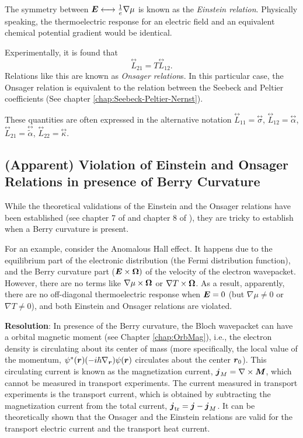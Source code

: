 \documentclass{report}
\renewcommand\vec[1]{\ensuremath\boldsymbol{#1}} %
\begin{document}
The symmetry between $\vec{E} \longleftrightarrow \frac{1}{e}\nabla \mu$ is known as the \textit{Einstein relation}. Physically speaking, the thermoelectric response for an electric field and an equivalent chemical potential gradient would be identical.
 
Experimentally, it is found that
\begin{equation}\label{Eq:Onsager-relation}
	\stackrel{\leftrightarrow}{L}_{21} = T \stackrel{\leftrightarrow}{L}_{12}.
\end{equation}
Relations like this are known as \textit{Onsager relation}s. In this particular case, the Onsager relation is equivalent to the relation between the Seebeck and Peltier coefficients (See chapter \ref{chap:Seebeck-Peltier-Nernst}).

These quantities are often expressed \cite{Ussishkin_2002} in the alternative notation $\stackrel{\leftrightarrow}{L}_{1 1} = \stackrel{\leftrightarrow}{\sigma}$, $\stackrel{\leftrightarrow}{L}_{1 2} = \stackrel{\leftrightarrow}{\alpha}$, $\stackrel{\leftrightarrow}{L}_{2 1} = \stackrel{\leftrightarrow}{\tilde{\alpha}}$, $\stackrel{\leftrightarrow}{L}_{2 2} = \stackrel{\leftrightarrow}{\kappa}$.

\subsection{(Apparent) Violation of Einstein and Onsager Relations in presence of Berry Curvature}\label{sec:Einstein-Onsager-violation}
While the theoretical validations of the Einstein and the Onsager relations have been established (see chapter 7 of \cite{book:ZimanSolidState} and chapter 8 of \cite{book:AshcroftMermin76}), they are tricky to establish when a Berry curvature is present.

For an example, consider the Anomalous Hall effect. It happens due to the equilibrium part of the electronic distribution (the Fermi distribution function), and the Berry curvature part ($\vec{E} \times \vec{\Omega})$ of the velocity of the electron wavepacket. However, there are no terms like $\nabla \mu \times \vec{\Omega}$ or $\nabla T \times \vec{\Omega}$. As a result, apparently, there are no off-diagonal thermoelectric response when $\vec{E} = 0$ (but $\nabla \mu \neq 0$ or $\nabla T \neq 0$), and both Einstein and Onsager relations are violated.

\textbf{Resolution}: In presence of the Berry curvature, the Bloch wavepacket can have a orbital magnetic moment (see Chapter \ref{chap:OrbMag}), i.e., the electron density is circulating about its center of mass (more specifically, the local value of the momentum, $\psi^*(\vec{r}) (-i \hbar \nabla_{\vec{r}}) \psi(\vec{r})$ circulates about the center $\vec{r}_0$). This circulating current is known as the magnetization current, $\vec{j}_M = \nabla \times \vec{M}$, which cannot be measured in transport experiments. The current measured in transport experiments is the transport current, which is obtained by subtracting the magnetization current from the total current, $\vec{j}_{\text{tr}} = \vec{j} - \vec{j}_M$. It can be theoretically shown that the Onsager and the Einstein relations are valid for the transport electric current and the transport heat current.
\end{document}
